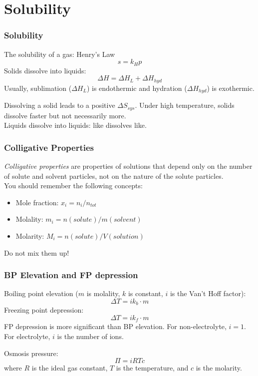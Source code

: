 \documentclass[aspectratio=169]{beamer}
\def\blankline{\\[6pt]}
\begin{document}
\section{Solubility}
\begin{frame}
  \frametitle{Solubility}
  The solubility of a gas: Henry's Law
  \begin{equation*}
    s = k_H p
  \end{equation*}
  Solids dissolve into liquids: 
  \begin{equation*}
    \Delta H = \Delta H_{L} + \Delta H_{hyd} 
  \end{equation*}
  Usually, sublimation ($\Delta H_L$) is endothermic and hydration ($\Delta H_{hyd}$) is exothermic.

  Dissolving a solid leads to a positive $\Delta S_{sys}$. Under high temperature, solids dissolve faster but 
  not necessarily more.
  \blankline
  Liquids dissolve into liquids: like dissolves like.
\end{frame}
\begin{frame}
  \frametitle{Colligative Properties}
  \textit{Colligative properties} are properties of solutions that depend only on the number of solute and solvent particles, not on the nature of the solute particles.
  \blankline
  You should remember the following concepts:
  \begin{itemize}
    \item Mole fraction: $x_i = n_i/n_{tot}$
    \item Molality: $m_i = n(solute)/m(solvent)$
    \item Molarity: $M_i = n(solute)/V(solution)$
  \end{itemize}
  Do not mix them up!
\end{frame}
\begin{frame}
  \frametitle{BP Elevation and FP depression}
  Boiling point elevation ($m$ is molality, $k$ is constant, $i$ is the Van't Hoff factor):
  \begin{equation*}
    \Delta T = i k_b \cdot m
  \end{equation*}
  Freezing point depression:
  \begin{equation*}
    \Delta T = i k_f \cdot m
  \end{equation*}
  FP depression is more significant than BP elevation. For non-electrolyte, $i = 1$. For electrolyte, $i$ is the number of ions.

  Osmosis pressure:
  \begin{equation*}
    \Pi = iRTc
  \end{equation*}
  where $R$ is the ideal gas constant, $T$ is the temperature, and $c$ is the molarity.
\end{frame}
\end{document}
